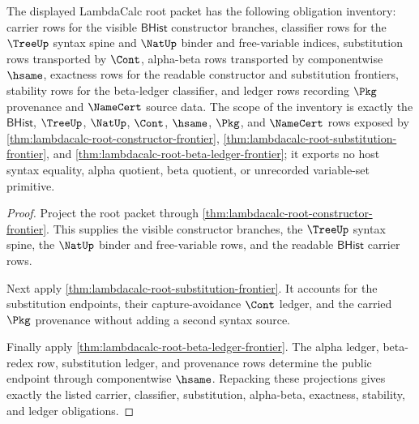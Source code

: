 \begin{theorem}
\label{thm:lambdacalc-root-obligation-inventory}
The displayed LambdaCalc root packet has the following obligation inventory:
carrier rows for the visible $\mathsf{BHist}$ constructor branches, classifier
rows for the $\TreeUp$ syntax spine and $\NatUp$ binder and free-variable
indices, substitution rows transported by $\Cont$, alpha-beta rows transported
by componentwise $\hsame$, exactness rows for the readable constructor and
substitution frontiers, stability rows for the beta-ledger classifier, and
ledger rows recording $\Pkg$ provenance and $\NameCert$ source data. The scope
of the inventory is exactly the $\mathsf{BHist}$, $\TreeUp$, $\NatUp$, $\Cont$,
$\hsame$, $\Pkg$, and $\NameCert$ rows exposed by
\autoref{thm:lambdacalc-root-constructor-frontier},
\autoref{thm:lambdacalc-root-substitution-frontier}, and
\autoref{thm:lambdacalc-root-beta-ledger-frontier}; it exports no host syntax
equality, alpha quotient, beta quotient, or unrecorded variable-set primitive.
\end{theorem}
\begin{proof}
Project the root packet through
\autoref{thm:lambdacalc-root-constructor-frontier}. This supplies the visible
constructor branches, the $\TreeUp$ syntax spine, the $\NatUp$ binder and
free-variable rows, and the readable $\mathsf{BHist}$ carrier rows.

Next apply \autoref{thm:lambdacalc-root-substitution-frontier}. It accounts for
the substitution endpoints, their capture-avoidance $\Cont$ ledger, and the
carried $\Pkg$ provenance without adding a second syntax source.

Finally apply \autoref{thm:lambdacalc-root-beta-ledger-frontier}. The alpha
ledger, beta-redex row, substitution ledger, and provenance rows determine the
public endpoint through componentwise $\hsame$. Repacking these projections
gives exactly the listed carrier, classifier, substitution, alpha-beta,
exactness, stability, and ledger obligations.
\end{proof}

